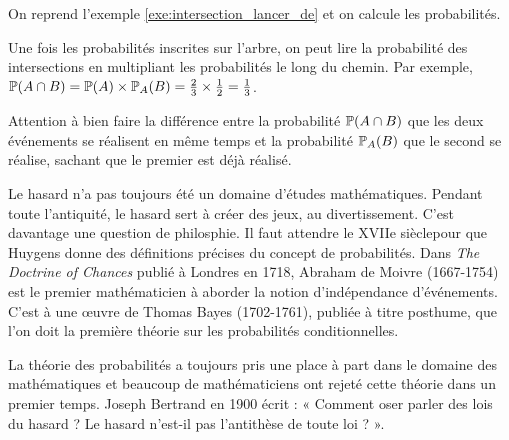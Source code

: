 \documentclass[10pt,a4paper,openany,twoside]{book}
\begin{document}
\begin{ex}{}{}
   On reprend l'exemple \ref{exe:intersection_lancer_de} et on calcule les probabilités.

\begin{minipage}{0.35\linewidth}
\end{minipage}
\begin{minipage}{0.65\linewidth}
  Une fois les probabilités inscrites sur l'arbre, on peut lire la probabilité des intersections en multipliant les probabilités le long du chemin. Par exemple, $\P(A\cap B) = \P(A)\times \P_A(B)=\frac{2}{3}\times\frac{1}{2}=\frac{1}{3}$.
\end{minipage}
\end{ex}

\begin{rem}{}{}
   Attention à bien faire la différence entre la probabilité $\P(A\cap B)$ que les deux événements se réalisent en même temps et la probabilité $\P_A(B)$ que le second se réalise, sachant que le premier est déjà réalisé.
\end{rem}

\begin{histoire}{}{}
  Le hasard n'a pas toujours été un domaine d'études mathématiques. Pendant toute l'antiquité, le hasard sert à créer des jeux, au divertissement. C'est davantage une question de philosphie. Il faut attendre le XVIIe sièclepour que Huygens donne des définitions précises du concept de probabilités. Dans \textit{The Doctrine of Chances} publié à Londres en 1718, Abraham de Moivre (1667-1754) est le premier mathématicien à aborder la notion d'indépendance d'événements. C'est à une œuvre de Thomas Bayes (1702-1761), publiée à titre posthume, que l'on doit la première théorie sur les probabilités conditionnelles.

  La théorie des probabilités a toujours pris une place à part dans le domaine des mathématiques et beaucoup de mathématiciens ont rejeté cette théorie dans un premier temps. Joseph Bertrand en 1900 écrit : « Comment oser parler des lois du hasard ? Le hasard n'est-il pas l'antithèse de toute loi ? ».
\end{histoire}
\end{document}
